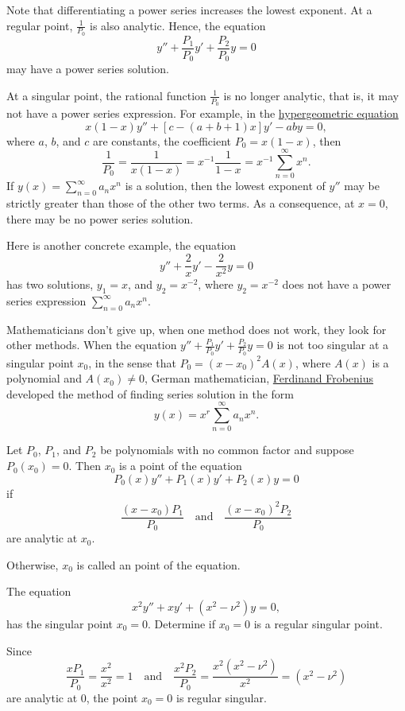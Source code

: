 Note that differentiating a power series increases the lowest exponent. At a regular point, $\frac{1}{P_0}$ is also analytic. Hence, the equation
\[y''+\frac{P_1}{P_0}y'+\frac{P_2}{P_0}y=0\]
may have a power series solution.

At a singular point, the rational function $\frac{1}{P_0}$ is no longer analytic, that is, it may not have a power series expression. For example, in the \href{https://encyclopediaofmath.org/wiki/Hypergeometric_equation}{hypergeometric equation}
\[x(1-x)y''+[c-(a+b+1)x]y'-aby=0,\]
where $a$, $b$, and $c$ are constants, the coefficient $P_0=x(1-x)$, then
\[\frac{1}{P_0}=\frac{1}{x(1-x)}=x^{-1}\frac{1}{1-x}=x^{-1}\sum_{n=0}^\infty x^n.\]
If $y(x)=\sum\limits_{n=0}^\infty a_nx^n$ is a solution, then the lowest exponent of $y''$ may be strictly greater than those of the other two terms. As a consequence, at $x=0$, there may be no power series solution. 

Here is another concrete example, the equation
\[y''+\frac2x y'-\frac{2}{x^2}y=0\]
has two solutions, $y_1=x$, and $y_2=x^{-2}$, where $y_2=x^{-2}$ does not have a power series expression $\sum_{n=0}^\infty a_nx^n$.

Mathematicians don't give up, when one method does not work, they look for other methods. When the equation $y''+\frac{P_1}{P_0}y'+\frac{P_2}{P_0}y=0$ is not too singular at a singular point $x_0$, in the sense that $P_0=(x-x_0)^2A(x)$, where $A(x)$ is a polynomial and $A(x_0)\ne 0$,   German mathematician, \href{https://en.wikipedia.org/wiki/Ferdinand_Georg_Frobenius}{Ferdinand Frobenius} developed the method of finding series solution in the form
\[y(x)=x^r\sum\limits_{n=0}^\infty a_nx^n.\]

\begin{definition}
  Let $P_0$, $P_1$, and $P_2$ be polynomials with no common factor and suppose $P_0(x_0)=0$. Then $x_0$ is a  point of the equation
  \[P_0(x)y''+P_1(x)y'+P_2(x)y=0\]
  if 
  \[\frac{(x-x_0)P_1}{P_0} \quad\text{and}\quad\frac{(x-x_0)^2P_2}{P_0}\]
  are analytic at $x_0$. 
  
  Otherwise, $x_0$ is called an  point of the equation.
\end{definition}

\begin{example}

The equation
\[x^2y''+xy'+(x^2-\nu^2)y=0,\]
has the singular point $x_0=0$. Determine if $x_0=0$ is a regular singular point.
\end{example}
\begin{solution}
  Since 
  \[\frac{xP_1}{P_0}=\frac{x^2}{x^2}=1\quad \text{and}\quad \frac{x^2P_2}{P_0}=\frac{x^2(x^2-\nu^2)}{x^2}=(x^2-\nu^2)\]
  are analytic at $0$, the point $x_0=0$ is regular singular. 
\end{solution}

